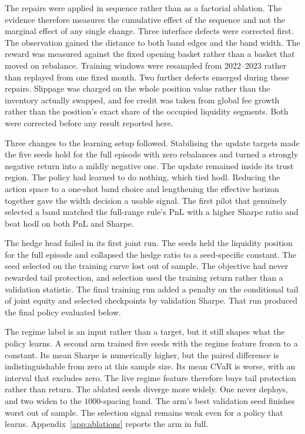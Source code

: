 The repairs were applied in sequence rather than as a factorial ablation. The
evidence therefore measures the cumulative effect of the sequence and not the
marginal effect of any single change. Three interface defects were corrected
first. The observation gained the distance to both band edges and the band
width. The reward was measured against the fixed opening basket rather than a
basket that moved on rebalance. Training windows were resampled from
2022--2023 rather than replayed from one fixed month. Two further defects
emerged during these repairs. Slippage was charged on the whole position value
rather than the inventory actually swapped, and fee credit was taken from
global fee growth rather than the position's exact share of the occupied
liquidity segments. Both were corrected before any result reported here.

Three changes to the learning setup followed. Stabilising the update targets
made the five seeds hold for the full episode with zero rebalances and turned
a strongly negative return into a mildly negative one. The update remained inside
its trust region. The policy had learned to do nothing, which tied
\textsf{hodl}. Reducing the action space to a one-shot band choice and
lengthening the effective horizon together gave the width decision a usable
signal. The first pilot that genuinely selected a band matched the full-range
rule's PnL with a higher Sharpe ratio and beat \textsf{hodl} on both PnL and
Sharpe.

The hedge head failed in its first joint run. The seeds held the liquidity
position for the full episode and collapsed the hedge ratio to a seed-specific
constant. The seed selected on the training curve lost out of sample. The
objective had never rewarded tail protection, and selection used the training
return rather than a validation statistic. The final training run added a
penalty on the conditional tail of joint equity and selected checkpoints by
validation Sharpe. That run produced the final policy evaluated below.

The regime label is an input rather than a target, but it still shapes what the
policy learns. A second arm trained five seeds with the regime feature frozen
to a constant. Its mean Sharpe is numerically higher, but the paired difference
is indistinguishable from zero at this sample size. Its mean CVaR is worse,
with an interval that excludes zero. The live regime feature therefore buys
tail protection rather than return. The ablated seeds diverge more widely. One
never deploys, and two widen to the $1000$-spacing band. The arm's best
validation seed finishes worst out of sample. The selection signal remains weak
even for a policy that learns. Appendix~\ref{app:ablations} reports the arm in
full.

